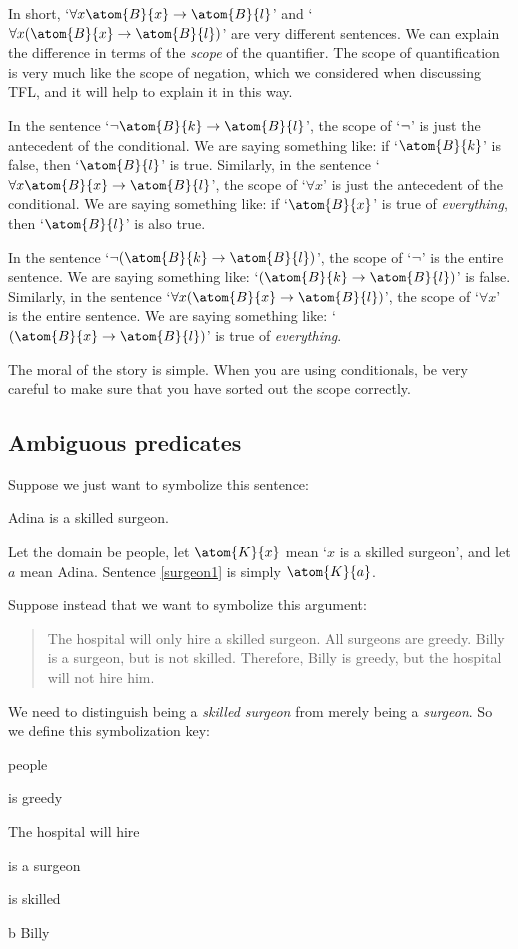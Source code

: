 In short, `$\forall x \atom{B}{x} \eif \atom{B}{l}$' and `$\forall x (\atom{B}{x} \eif \atom{B}{l})$' are very different sentences. We can explain the difference in terms of the \emph{scope} of the quantifier. The scope of quantification is very much like the scope of negation, which we considered when discussing TFL, and it will help to explain it in this way.

In the sentence `$\enot \atom{B}{k} \eif \atom{B}{l}$', the scope of `$\neg$' is just the antecedent of the conditional. We are saying something like: if `$\atom{B}{k}$' is false, then `$\atom{B}{l}$' is true. Similarly, in the sentence `$\forall x \atom{B}{x} \eif \atom{B}{l}$', the scope of `$\forall x$' is just the antecedent of the conditional. We are saying something like: if `$\atom{B}{x}$' is true of \emph{everything}, then `$\atom{B}{l}$' is also true.

In the sentence `$\enot(\atom{B}{k} \eif \atom{B}{l})$', the scope of `$\neg$' is the entire sentence. We are saying something like: `$(\atom{B}{k} \eif \atom{B}{l})$' is false. Similarly, in the sentence `$\forall x (\atom{B}{x} \eif \atom{B}{l})$', the scope of `$\forall x$' is the entire sentence. We are saying something like: `$(\atom{B}{x} \eif \atom{B}{l})$' is true of \emph{everything}.

The moral of the story is simple. When you are using conditionals, be very careful to make sure that you have sorted out the scope correctly.

\subsection{Ambiguous predicates}

Suppose we just want to symbolize this sentence:
\begin{earg}
\item[\ex{surgeon1}] Adina is a skilled surgeon.
\end{earg}
Let the domain be people, let $\atom{K}{x}$ mean `$x$ is a skilled surgeon', and let $a$ mean Adina. Sentence \ref{surgeon1} is simply $\atom{K}{a}$.


Suppose instead that we want to symbolize this argument:
\begin{quote}
The hospital will only hire a skilled surgeon. All surgeons are greedy. Billy is a surgeon, but is not skilled. Therefore, Billy is greedy, but the hospital will not hire him.
\end{quote}
We need to distinguish being a \emph{skilled surgeon} from merely being a \emph{surgeon}. So we define this symbolization key:
\begin{ekey}
\item[\text{domain}] people
\item[\atom{G}{x}]  is greedy
\item[\atom{H}{x}] The hospital will hire 
\item[\atom{R}{x}]  is a surgeon
\item[\atom{K}{x}]  is skilled
\item[b] Billy
\end{ekey}

